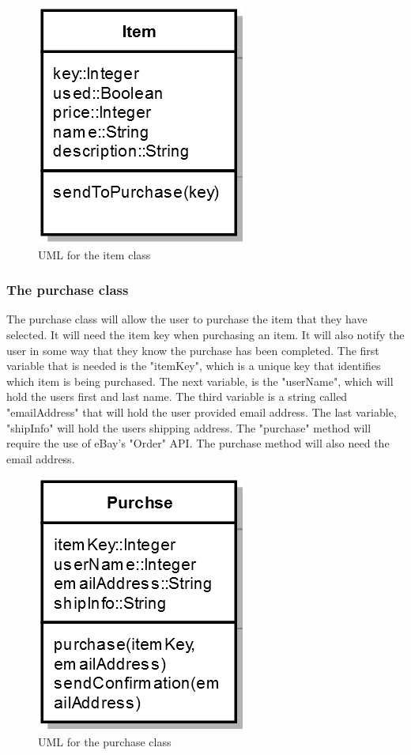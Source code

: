 \documentclass[journal,compsoc, 10pt, draftclsnofoot, onecolumn]{IEEEtran}
\begin{document}
\begin{figure}[h]
\centering
\caption{UML for the item class}
\includegraphics[scale=.9]{itemUML}
\end{figure}
\FloatBarrier

\subsubsection*{The purchase class}
The purchase class will allow the user to purchase the item that they have 
selected. It will need the item key when purchasing an item. It will also notify
the user in some way that they know the purchase has been completed. The first 
variable that is needed is the "itemKey", which is a unique key that identifies 
which item is being purchased. The next variable, is the "userName", which will 
hold the users first and last name. The third variable is a string called 
"emailAddress" that will hold the user provided email address. The last variable, 
"shipInfo" will hold the users shipping address. The "purchase" method will 
require the use of eBay's "Order" API. The purchase method will also need the 
email address. 

\begin{figure}[h]
\centering
\caption{UML for the purchase class}
\includegraphics[scale=.9]{purchaseUML}
\end{figure}
\FloatBarrier
\end{document}
